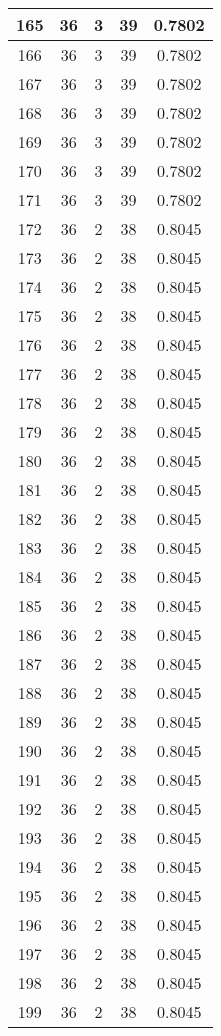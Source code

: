 \documentclass[letterpaper, 12pt]{article}
\begin{document}
\begin{longtable}{|c|c|c|c|c|}
\hline
165 & 36 & 3 & 39 & 0.7802 \\
\hline
166 & 36 & 3 & 39 & 0.7802 \\
\hline
167 & 36 & 3 & 39 & 0.7802 \\
\hline
168 & 36 & 3 & 39 & 0.7802 \\
\hline
169 & 36 & 3 & 39 & 0.7802 \\
\hline
170 & 36 & 3 & 39 & 0.7802 \\
\hline
171 & 36 & 3 & 39 & 0.7802 \\
\hline
172 & 36 & 2 & 38 & 0.8045 \\
\hline
173 & 36 & 2 & 38 & 0.8045 \\
\hline
174 & 36 & 2 & 38 & 0.8045 \\
\hline
175 & 36 & 2 & 38 & 0.8045 \\
\hline
176 & 36 & 2 & 38 & 0.8045 \\
\hline
177 & 36 & 2 & 38 & 0.8045 \\
\hline
178 & 36 & 2 & 38 & 0.8045 \\
\hline
179 & 36 & 2 & 38 & 0.8045 \\
\hline
180 & 36 & 2 & 38 & 0.8045 \\
\hline
181 & 36 & 2 & 38 & 0.8045 \\
\hline
182 & 36 & 2 & 38 & 0.8045 \\
\hline
183 & 36 & 2 & 38 & 0.8045 \\
\hline
184 & 36 & 2 & 38 & 0.8045 \\
\hline
185 & 36 & 2 & 38 & 0.8045 \\
\hline
186 & 36 & 2 & 38 & 0.8045 \\
\hline
187 & 36 & 2 & 38 & 0.8045 \\
\hline
188 & 36 & 2 & 38 & 0.8045 \\
\hline
189 & 36 & 2 & 38 & 0.8045 \\
\hline
190 & 36 & 2 & 38 & 0.8045 \\
\hline
191 & 36 & 2 & 38 & 0.8045 \\
\hline
192 & 36 & 2 & 38 & 0.8045 \\
\hline
193 & 36 & 2 & 38 & 0.8045 \\
\hline
194 & 36 & 2 & 38 & 0.8045 \\
\hline
195 & 36 & 2 & 38 & 0.8045 \\
\hline
196 & 36 & 2 & 38 & 0.8045 \\
\hline
197 & 36 & 2 & 38 & 0.8045 \\
\hline
198 & 36 & 2 & 38 & 0.8045 \\
\hline
199 & 36 & 2 & 38 & 0.8045 \\
\hline
\end{longtable}
\end{document}
